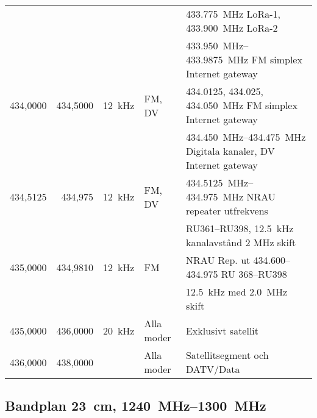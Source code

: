 \begin{tabular}{rrrll}
         &          &         &              & \qty{433,775}{\mega\hertz} LoRa-1, \qty{433,900}{\mega\hertz} LoRa-2 \\ 
         &          &         &              & \SIrange{433,950}{433,9875}{\mega\hertz} FM simplex Internet gateway \\ \hline
434,0000 & 434,5000 & \qty{12}{\kilo\hertz} &  FM, DV & \num{434,0125}, \num{434,025}, \qty{434,050}{\mega\hertz} FM simplex Internet gateway \\
         &          &         &              & \SIrange{434,450}{434,475}{\mega\hertz} Digitala kanaler, DV Internet gateway\\ \hline
434,5125 & 434,975 & \qty{12}{\kilo\hertz} & FM, DV     & \SIrange{434,5125}{434,975}{\mega\hertz} NRAU repeater utfrekvens \\
         &           &         &              & RU361--RU398, \qty{12,5}{\kilo\hertz} kanalavstånd  2 MHz skift \\ \hline
435,0000 & 434,9810 & \qty{12}{\kilo\hertz} & FM           & NRAU Rep. ut \numrange{434,600}{434,975} RU 368--RU398       \\
         &          &         &              & \qty{12,5}{\kilo\hertz} med \qty{2,0}{\mega\hertz} skift       \\ \hline
435,0000 & 436,0000 & \qty{20}{\kilo\hertz} & Alla moder     & Exklusivt satellit \\ \hline
436,0000 & 438,0000 &         & Alla moder  & Satellitsegment och DATV/Data \\
\end{tabular}

\subsection{Bandplan \qty{23}{\centi\metre}, \SIrange{1240}{1300}{\mega\hertz}}
\label{1296MHZbandplan}


